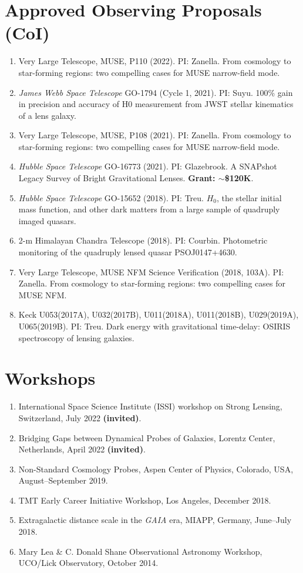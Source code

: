 \documentclass[margin, line]{res}
\begin{document}
\begin{resume}
\section{\sc Approved Observing Proposals (CoI)}
\begin{enumerate}
\item Very Large Telescope, MUSE, P110 (2022). PI: Zanella. From cosmology to star-forming regions: two compelling cases for MUSE narrow-field mode.
\item \textit{James Webb Space Telescope} GO-1794 (Cycle 1, 2021). PI: Suyu. 100\% gain in precision and accuracy of H0 measurement from JWST stellar kinematics of a lens galaxy. 
\item Very Large Telescope, MUSE, P108 (2021). PI: Zanella. From cosmology to star-forming regions: two compelling cases for MUSE narrow-field mode.
\item \textit{Hubble Space Telescope} GO-16773 (2021). PI: Glazebrook. A SNAPshot Legacy Survey of Bright Gravitational Lenses. \textbf{Grant: $\sim$\$120K}.
\item \textit{Hubble Space Telescope} GO-15652 (2018). PI: Treu. $H_0$, the stellar initial mass function, and other dark matters from a large sample of quadruply imaged quasars.
\item 2-m Himalayan Chandra Telescope (2018). PI: Courbin. Photometric monitoring of the quadruply lensed quasar PSOJ0147+4630.
\item Very Large Telescope, MUSE NFM Science Verification (2018, 103A). PI: Zanella. From cosmology to star-forming regions: two compelling cases for MUSE NFM.
\item Keck U053(2017A), U032(2017B), U011(2018A),  U011(2018B), U029(2019A), U065(2019B). PI: Treu. Dark energy with gravitational time-delay: OSIRIS spectroscopy of lensing galaxies.
\end{enumerate}


\section{\sc Workshops}
\begin{enumerate}
	\item International Space Science Institute (ISSI) workshop on Strong Lensing, Switzerland, July 2022 \textbf{(invited)}.
	\item Bridging Gaps between Dynamical Probes of Galaxies, Lorentz Center, Netherlands, April 2022 \textbf{(invited)}.
	\item Non-Standard Cosmology Probes, Aspen Center of Physics, Colorado, USA, August--September 2019.
	\item TMT Early Career Initiative Workshop, Los Angeles, December 2018.
	\item Extragalactic distance scale in the \textit{GAIA} era, MIAPP, Germany, June--July 2018.
	\item Mary Lea \& C. Donald Shane Observational Astronomy Workshop, UCO/Lick Observatory, October 2014.
\end{enumerate}


\end{resume}
\end{document}

